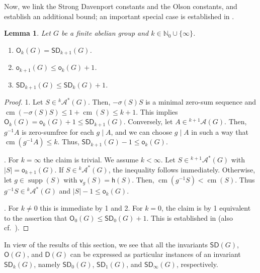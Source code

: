\documentclass{amsart}
\newtheorem{lem}[thm]{Lemma}
\theoremstyle{definition}
\numberwithin{equation}{section}
\begin{document}
Now, we link the Strong Davenport constants and the Olson constants,
and establish an additional bound; an important special case is established in \cite{baliski,baginski}.

\begin{lem}
\label{lr_lem_basic}
Let $G$ be a finite abelian group and $k \in \mathbb{N}_0 \cup \{\infty\}$.
\begin{enumerate}
\item ${\mathsf{O}}_k(G) = {\mathsf{SD}}_{k+1}(G)$.
\item ${\mathsf{o}}_{k+1}(G) \le {\mathsf{o}}_k(G) + 1$.
\item ${\mathsf{SD}}_{k+1}(G) \le {\mathsf{SD}}_{k}(G) + 1$.
\end{enumerate}
\end{lem}
\begin{proof}
1. Let $S\in {{}^{{k}}\!\mathcal{A}^{\ast}}(G)$. Then, $-\sigma(S)S$ is a minimal zero-sum sequence and $\operatorname{cm}( - \sigma(S) S) \le 1 + \operatorname{cm}(S)\le k+1$. This implies ${\mathsf{O}}_k(G) = {\mathsf{o}}_k(G) + 1 \le {\mathsf{SD}}_{k+1}(G)$.
Conversely, let $A \in {{}^{{k+1}}\!\mathcal{A}}(G)$. Then, $g^{-1}A$ is zero-sumfree for each $g \mid A$,
and we can choose $g\mid A$ in such a way that $\operatorname{cm}(g^{-1}A)\le k$. Thus, ${\mathsf{SD}}_{k+1}(G)-1 \le {\mathsf{o}}_k(G)$.

. For $k=\infty$ the claim is trivial. We assume $k<\infty$.
Let $S \in {{}^{{k+1}}\!\mathcal{A}^{\ast}}(G)$ with $|S|= {\mathsf{o}}_{k+1}(G)$.
If $S \in {{}^{{k}}\!\mathcal{A}^{\ast}}(G)$, the inequality follows immediately.
Otherwise, let $g \in \operatorname{supp}(S)$ with $\mathsf{v}_g(S)= \mathsf{h}(S)$. Then, $\operatorname{cm} (g^{-1}S) < \operatorname{cm} (S)$.
Thus $g^{-1}S \in {{}^{{k}}\!\mathcal{A}^{\ast}}(G)$ and $|S|-1 \le {\mathsf{o}}_k(G)$.

. For $k\neq 0$ this is immediate by 1 and 2. For $k=0$, the claim is by 1 equivalent to the assertion that ${\mathsf{O}}_0(G)\le {\mathsf{SD}}_0(G) +1$. This is established in \cite{baliski,baginski} (also cf.~\cite{GaoGe1}).
\end{proof}

In view of the results of this section, we see that all the invariants
 ${\mathsf{SD}}(G)$, ${\mathsf{O}}(G)$, and ${\mathsf{D}}(G)$ can be expressed as particular instances of
an invariant ${\mathsf{SD}}_k(G)$, namely ${\mathsf{SD}}_0(G)$, ${\mathsf{SD}}_1(G)$, and ${\mathsf{SD}}_{\infty}(G)$, respectively.
\end{document}
